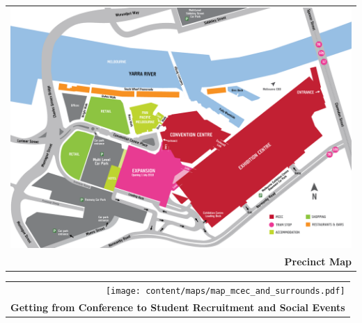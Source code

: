 
\cleardoublepageEVEN


\begin{center}
    \begin{tabular}{r}
    \includegraphics[angle=90,width=\textwidth]{content/maps/mcec_precinct.pdf}
    \\
    \textbf{Precinct Map}
    \end{tabular}
\end{center}

\begin{center}
  \begin{tabular}{r}
    \texttt{[image: content/maps/map\_mcec\_and\_surrounds.pdf]}
    \\
    \textbf{Getting from Conference to Student Recruitment and Social Events}
  \end{tabular}
  \label{page:surrounds-map}
\end{center}


